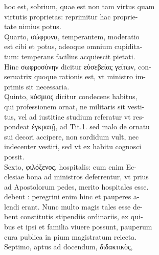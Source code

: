 \documentclass{article}
\begin{document}
\begin{pages}
                hoc est, sobrium, quae est non tam virtus quam \\
                virtutis proprietas: reprimitur hac proprie- \\
                tate nimius potus. \\
                Quarto, σώφρονα, temperantem, moderatio \\
                est cibi et potus, adeoque omnium cupidita- \\
                tum: temperans facilius acquiescit pietati. \\
                Hinc σωφροσύνην dicitur εὐσεβείας γείτων, con- \\
                seruatrix quoque rationis est, vt ministro im- \\
                primis sit necessaria. \\
                Quinto, κόσμιος dicitur condecens habitus, \\
                qui professionem ornat, ne militaris sit vesti- \\
                tus, vel ad iustitiae studium referatur vt res- \\
                pondeat ἐγκρατῇ, ad Tit.1. sed malo de ornatu \\
                sui decori accipere, non sordidum vult, nec \\
                indecenter vestiri, sed vt ex habitu cognosci \\
                possit. \\
                Sexto, φιλόξενος, hospitalis: cum enim Ec- \\
                clesiae bona ad ministros deferrentur, vt prius \\
                ad Apostolorum pedes, merito hospitales esse. \\
                debent : peregrini enim hinc et pauperes a- \\
                lendi erant. Nunc multo magis tales esse de- \\
                bent constitutis stipendiis ordinariis, ex qui- \\
                bus et ipsi et familia viuere possunt, pauperum \\
                cura publica in pium magistratum reiecta. \\
                Septimo, aptus ad docendum, διδακτικὸς, \\

\end{pages}
\end{document}
